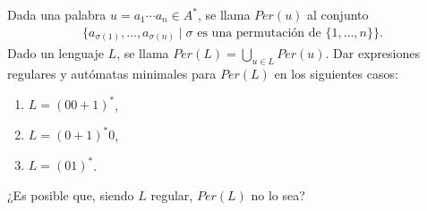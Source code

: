 \begin{ejercicio}
    Dada una palabra $u = a_1 \cdots a_n \in A^*$, se llama $Per(u)$ al conjunto
    \begin{align*}
        \{a_{\sigma(1)}, \ldots, a_{\sigma(n)} \mid \sigma \text{ es una permutación de } \{1, \ldots, n\}\}.
    \end{align*}
    Dado un lenguaje $L$, se llama $Per(L) = \bigcup\limits_{u \in L} Per(u)$.
    Dar expresiones regulares y autómatas minimales para $Per(L)$ en los siguientes casos:
    \begin{enumerate}
        \item $L = (00 + 1)^*$,
        \item $L = (0 + 1)^*0$,
        \item $L = (01)^*$.
    \end{enumerate}
    ¿Es posible que, siendo $L$ regular, $Per(L)$ no lo sea?
\end{ejercicio}